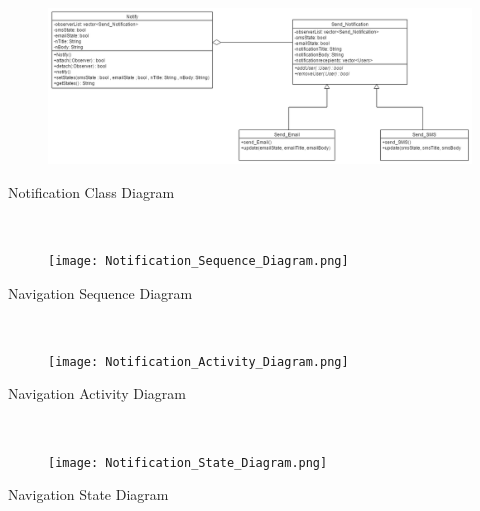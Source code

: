 \documentclass{article}
\begin{document}
\mbox{}\\
\bigskip


\begin{figure}[h!]
  \includegraphics[width=1.3\textwidth]{Notifications_Class_Diagram.png}
\end{figure}
Notification Class Diagram

\mbox{}\\
\bigskip


\begin{figure}[h!]
  \texttt{[image: Notification\_Sequence\_Diagram.png]}
\end{figure}
Navigation Sequence Diagram

\mbox{}\\
\bigskip
\clearpage

\begin{figure}[h!]
  \texttt{[image: Notification\_Activity\_Diagram.png]}
\end{figure}
Navigation Activity Diagram

\mbox{}\\
\bigskip

\begin{figure}[h!]
  \texttt{[image: Notification\_State\_Diagram.png]}
\end{figure}
Navigation State Diagram

\mbox{}\\
\end{document}
